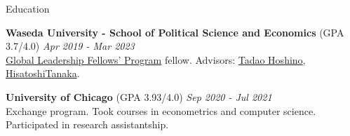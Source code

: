 \documentclass{resume} %
\begin{document}
\begin{rSection}{Education}

{\bf Waseda University - School of Political Science and Economics }(GPA 3.7/4.0) \hfill {\em Apr 2019 - Mar 2023} 
\\\href{http://www2.cie-waseda.jp/glfp/jp/about/program.html}{Global Leadership Fellows' Program} fellow. Advisors: \href{https://tadaohoshino.wordpress.com/}{Tadao Hoshino}, \href{https://waseda.pure.elsevier.com/en/persons/hisatoshi-tanaka}{HisatoshiTanaka}.

{\bf University of Chicago }(GPA 3.93/4.0) \hfill {\em Sep 2020 - Jul 2021} 
\\Exchange program. Took courses in econometrics and computer science. Participated in research assistantship. 

%


\end{rSection}

\end{document}
